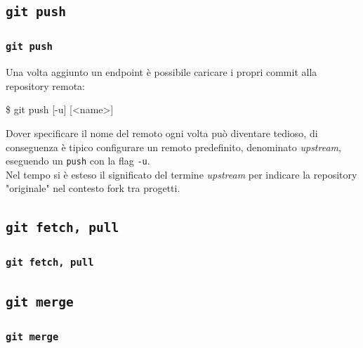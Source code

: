 \documentclass{beamer}
\begin{document}
\subsection{\texttt{git push}}
\begin{frame}
  \frametitle{\texttt{git push}}
  Una volta aggiunto un endpoint \`e possibile caricare i propri commit alla
  repository remota:
  \begin{semiverbatim}
  \$ git push [-u] [<name>]
  \end{semiverbatim}
  Dover specificare il nome del remoto ogni volta pu\`o diventare tedioso, di
  conseguenza \`e tipico configurare un remoto predefinito, denominato
  \emph{upstream}, eseguendo un \texttt{push} con la flag \texttt{-u}. \\
  Nel tempo si \`e esteso il significato del termine \emph{upstream} per
  indicare la repository "originale" nel contesto fork tra progetti.
\end{frame}

\subsection{\texttt{git fetch, pull}}
\begin{frame}
  \frametitle{\texttt{git fetch, pull}}
\end{frame}

\subsection{\texttt{git merge}}
\begin{frame}
  \frametitle{\texttt{git merge}}
\end{frame}
\end{document}
